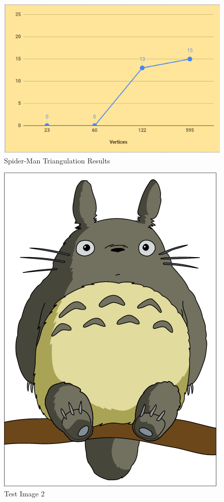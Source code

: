 \documentclass[conference]{IEEEtran}
\begin{document}
\begin{figure}
    \centering
    \includegraphics[scale=0.5]{spidermanGraph}
    \caption{Spider-Man Triangulation Results}
    \label{fig:graphspider}
\end{figure}
\begin{figure}
    \centering
    \includegraphics[scale=0.3]{totoro}
    \caption{Test Image 2}
    \label{fig:testImage2}
\end{figure}
\end{document}
